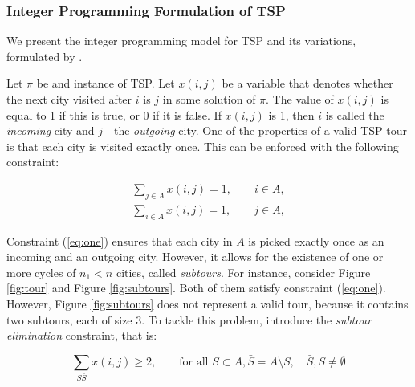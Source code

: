 \documentclass{mprop}
\theoremstyle{definition}
\begin{document}


\subsubsection{Integer Programming Formulation of TSP}
\label{sec:iptspformulation}
We present the integer programming model for TSP and its variations, formulated by \citet{Dantzig54}.

Let $\pi$ be and instance of TSP. Let $x(i,j)$ be a variable that denotes whether the next city visited after $i$ is $j$ in some solution of $\pi$. The value of $x(i,j)$ is equal to 1 if this is true, or 0 if it is false. If $x(i,j)$ is 1, then $i$ is called the \textit{incoming} city and $j$ - the \textit{outgoing} city. One of the properties of a valid TSP tour is that each city is visited exactly once. This can be enforced with the following constraint:

\begin{equation}
\label{eq:one}
\begin{split}
  \sum_{j \in A} x(i,j) = 1, \qquad i \in A,\\
  \sum_{i \in A} x(i,j) = 1, \qquad j \in A,
\end{split}
\end{equation}

Constraint (\ref{eq:one}) ensures that each city in $A$ is picked exactly once as an incoming and an outgoing city. However, it allows for the existence of one or more cycles of $n_{1} < n$ cities, called \textit{subtours}. For instance, consider Figure \ref{fig:tour} and Figure \ref{fig:subtours}. Both of them satisfy constraint (\ref{eq:one}). However, Figure \ref{fig:subtours} does not represent a valid tour, because it contains two subtours, each of size 3. To tackle this problem, \citet{Dantzig54} introduce the \textit{subtour elimination} constraint, that is:


\begin{equation}
\label{eq:subtourElimination}
\sum_{S\bar{S}} x(i,j) \geq 2, \qquad \textrm{for all } S \subset A, \bar{S} = A \setminus S, \quad \bar{S},S \neq \emptyset
\end{equation}
\end{document}
